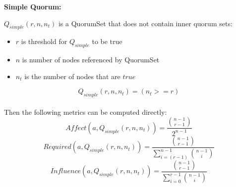 \documentclass[10pt]{article}
\begin{document}
\newcommand{\powerset}[1]{\mathbb{P}(#1)}

\newcommand{\effectedExpression}[0]{ \sum_{N_t \in P} Q(\{1\},N_t) \land \lnot Q(\{\},N_t) }
\newcommand{\affectDenomExpression}[0]{ 2^{n-1} }
\newcommand{\requireDenomExpression}[0]{ \sum_{N_t \in P} Q(\{a\},N_t) }
\newcommand{\influenceDenomExpression}[0]{ \sum_{N_t \in P} \lnot Q(\{\},N_t) }

\setcounter{equation}{5}
%

\newcommand{\effectedCombinationsExpression}[0]{ \binom{n-1}{r-1} }




\textbf{Simple Quorum:}\\\par
$Q_{simple}(r,n,n_t)$ is a QuorumSet that does not contain inner quorum sets:
\begin{itemize}
  \item $r$ is threshold for $Q_{simple}$ to be true
  \item $n$ is number of nodes referenced by QuorumSet
  \item $n_t$ is the number of nodes that are $true$
\end{itemize}
\begin{equation}
    Q_{simple}(r,n,n_t) = (n_t>=r)
\end{equation}
\\

Then the following metrics can be computed directly:
\begin{equation}
	Affect(a,Q_{simple}(r,n,n_t)) = \frac{ \effectedCombinationsExpression{} }{ \affectDenomExpression{} }
\end{equation}
\begin{equation}
	Required(a,Q_{simple}(r,n,n_t)) = \frac{ \effectedCombinationsExpression{} }{ \sum_{i=(r-1)}^{n-1} \binom{n-1}{i} }
\end{equation}
\begin{equation}
	Influence(a,Q_{simple}(r,n,n_t)) = \frac{ \effectedCombinationsExpression{} }{ \sum_{i=0}^{r-1} \binom{n-1}{i} }
\end{equation}
\end{document}
